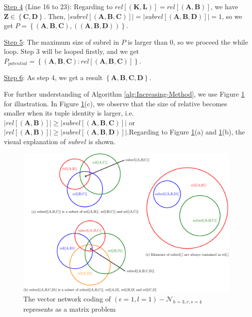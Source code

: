 \begin{example}
\uline{Step 4} (Line 16 to 23): Regarding to $rel\left[\left(\boldsymbol{K},\boldsymbol{L}\right)\right]=rel\left[\left(\boldsymbol{A},\boldsymbol{B}\right)\right]$,
we have $\boldsymbol{Z}\in\left\{ \boldsymbol{C},\boldsymbol{D}\right\} $.
Then, $\left|subrel\left[\left(\boldsymbol{A},\boldsymbol{B},\boldsymbol{C}\right)\right]\right|=\left|subrel\left[\left(\boldsymbol{A},\boldsymbol{B},\boldsymbol{D}\right)\right]\right|=1$,
so we get $P=\left\{ \left(\boldsymbol{A},\boldsymbol{B},\boldsymbol{C}\right),\left(\left(\boldsymbol{A},\boldsymbol{B},\boldsymbol{D}\right)\right)\right\} $.

\uline{Step 5}: The maximum size of subrel in $P$ is larger than
$0$, so we proceed the while loop. Step 3 will be looped firstly,
and we get $P_{potential}=\left\{ \left(\boldsymbol{A},\boldsymbol{B},\boldsymbol{C}\right):rel\left[\left(\boldsymbol{A},\boldsymbol{B},\boldsymbol{C}\right)\right]\right\} $.

\uline{Step 6}: As step 4, we get a result $\left\{ \boldsymbol{A},\boldsymbol{B},\boldsymbol{C},\boldsymbol{D}\right\} $.
\end{example}
%
\begin{example}
For further understanding of Algorithm \ref{alg:Increasing-Method},
we use Figure \ref{fig:rel_example} for illustration. In Figure \ref{fig:rel_example}(c),
we observe that the size of relative becomes smaller when its tuple
identity is larger, i.e. $\left|rel\left[\left(\boldsymbol{A},\boldsymbol{B}\right)\right]\right|\geq\left|subrel\left[\left(\boldsymbol{A},\boldsymbol{B},\boldsymbol{C}\right)\right]\right|$
or $\left|rel\left[\left(\boldsymbol{A},\boldsymbol{B}\right)\right]\right|\geq\left|subrel\left[\left(\boldsymbol{A},\boldsymbol{B},\boldsymbol{D}\right)\right]\right|$.Regarding
to Figure \ref{fig:rel_example}(a) and \ref{fig:rel_example}(b),
the visual explanation of $subrel$ is shown.
\end{example}
\begin{figure}[H]
\caption{The vector network coding of $(\epsilon=1,l=1)-\mathcal{N}_{h=3,r,s=4}$
represents as a matrix problem\label{fig:rel_example}}

\centering{}\includegraphics[width=0.5\paperwidth]{../figures/rel_example}
\end{figure}

